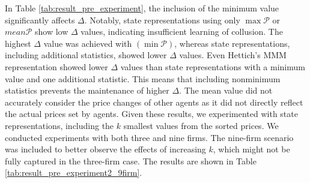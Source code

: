 \documentclass[runningheads]{llncs}
\begin{document}
    In Table \ref{tab:result_pre_experiment}, the inclusion of the minimum value significantly affects $\Delta$.
    Notably, state representations using only $\max{\mathcal{P}}$ or $mean{\mathcal{P}}$ show low $\Delta$ values, indicating insufficient learning of collusion.
    The highest $\Delta$ value was achieved with $(\min{\mathcal{P}})$, whereas state representations, including additional statistics, showed lower $\Delta$ values.
    Even Hettich’s MMM representation showed lower $\Delta$ values than state representations with a minimum value and one additional statistic.
    This means that including nonminimum statistics prevents the maintenance of higher $\Delta$.
    The mean value did not accurately consider the price changes of other agents as it did not directly reflect the actual prices set by agents.
    Given these results, we experimented with state representations, including the $k$ smallest values from the sorted prices.
    We conducted experiments with both three and nine firms. The nine-firm scenario was included to better observe the effects of increasing $k$, which might not be fully captured in the three-firm case.
    The results are shown in Table \ref{tab:result_pre_experiment2_9firm}.

\end{document}
